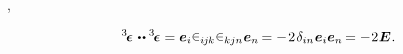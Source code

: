 \vspace{-0.3em}
,

\nopagebreak\vspace{-0.2em}\begin{equation}\label{thedirectrelationoftheunitdyadwiththepermutationsparity}
\permutationsparitytensor \hspace{.2ex} \dotdotp \permutationsparitytensor
= \bm{e}_i \permutationsparitysymbols{i\hspace{-0.1ex}j\hspace{-0.1ex}k} \permutationsparitysymbols{kjn} \bm{e}_n \hspace{-0.2ex}
= - \hspace{.2ex} 2 \hspace{.2ex} \delta_{in} \hspace{.12ex} \bm{e}_i \bm{e}_n \hspace{-0.2ex}
= - \hspace{.1ex} 2 \hspace{.1ex} \UnitDyad
\hspace{.1ex} .
\end{equation}

